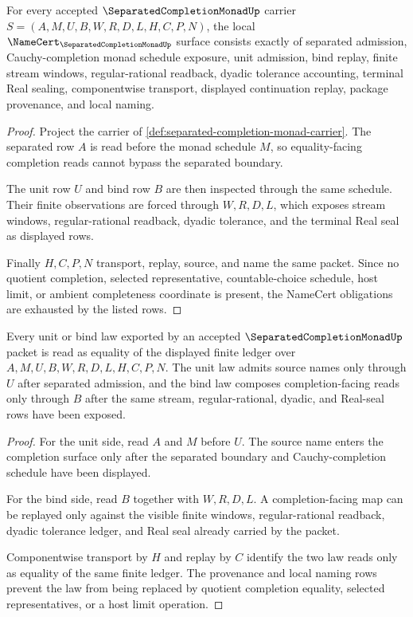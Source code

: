 \begin{theorem}
\label{thm:separated-completion-monad-namecert-obligations}
For every accepted $\SeparatedCompletionMonadUp$ carrier $S=(A,M,U,B,W,R,D,L,H,C,P,N)$, the local $\NameCert_{\SeparatedCompletionMonadUp}$ surface consists exactly of separated admission, Cauchy-completion monad schedule exposure, unit admission, bind replay, finite stream windows, regular-rational readback, dyadic tolerance accounting, terminal Real sealing, componentwise transport, displayed continuation replay, package provenance, and local naming.
\end{theorem}
\begin{proof}
Project the carrier of \autoref{def:separated-completion-monad-carrier}. The separated row $A$ is read before the monad schedule $M$, so equality-facing completion reads cannot bypass the separated boundary.

The unit row $U$ and bind row $B$ are then inspected through the same schedule. Their finite observations are forced through $W,R,D,L$, which exposes stream windows, regular-rational readback, dyadic tolerance, and the terminal Real seal as displayed rows.

Finally $H,C,P,N$ transport, replay, source, and name the same packet. Since no quotient completion, selected representative, countable-choice schedule, host limit, or ambient completeness coordinate is present, the NameCert obligations are exhausted by the listed rows.
\end{proof}

\begin{theorem}
\label{thm:separated-completion-monad-unit-bind-laws}
Every unit or bind law exported by an accepted $\SeparatedCompletionMonadUp$ packet is read as equality of the displayed finite ledger over $A,M,U,B,W,R,D,L,H,C,P,N$. The unit law admits source names only through $U$ after separated admission, and the bind law composes completion-facing reads only through $B$ after the same stream, regular-rational, dyadic, and Real-seal rows have been exposed.
\end{theorem}
\begin{proof}
For the unit side, read $A$ and $M$ before $U$. The source name enters the completion surface only after the separated boundary and Cauchy-completion schedule have been displayed.

For the bind side, read $B$ together with $W,R,D,L$. A completion-facing map can be replayed only against the visible finite windows, regular-rational readback, dyadic tolerance ledger, and Real seal already carried by the packet.

Componentwise transport by $H$ and replay by $C$ identify the two law reads only as equality of the same finite ledger. The provenance and local naming rows prevent the law from being replaced by quotient completion equality, selected representatives, or a host limit operation.
\end{proof}

